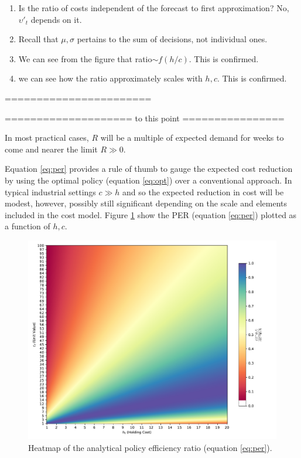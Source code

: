 \begin{enumerate}
	\item Is the ratio of costs independent of the forecast to first approximation? No, $\upsilon'_t$ depends on it.
	\item Recall that $\mu,\sigma $ pertains to the sum of decisions, not individual ones.
	\item We can see from the figure that ratio$\sim f(h/c)$. This is confirmed.
	\item we can see how the ratio approximately scales with $h,c$. This is confirmed.
\end{enumerate}




=======================


==================== to this point ================

In most practical cases, $R$ will be a multiple of expected demand for weeks to come and nearer the limit $R\gg 0$. 




Equation \eqref{eq:per} provides a rule of thumb to gauge the expected cost reduction by using the optimal policy (equation \eqref{eq:opt}) over a conventional approach. In typical industrial settings $c\gg h$ and so the expected reduction in cost will be modest, however, possibly still significant depending on the scale and elements included in the cost model. Figure \ref{fig:heatmap_analytical} show the PER (equation \eqref{eq:per}) plotted as a function of $h,c$.
\begin{figure}[h!]
	\centering
	\includegraphics[width=\textwidth]{figures/analytical_per.pdf}
	\caption{Heatmap of the analytical policy efficiency ratio (equation \eqref{eq:per}).}
	\label{fig:heatmap_analytical}
\end{figure}